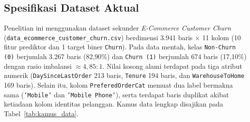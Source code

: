 \documentclass[11pt,a4paper]{article}
\DeclareRobustCommand{\code}[1]{\texttt{\textcolor{CodeColor}{#1}}}
\begin{document}
\subsection{Spesifikasi Dataset Aktual}

Penelitian ini menggunakan dataset sekunder \textit{E-Commerce Customer Churn} (\code{data\_\allowbreak ecommerce\_\allowbreak customer\_\allowbreak churn.csv}) berdimensi 3.941 baris $\times$ 11 kolom (10 fitur prediktor dan 1 target biner \code{Churn}). Pada data mentah, kelas \code{Non-Churn (0)} berjumlah 3.267 baris (82,90\%) dan \code{Churn (1)} berjumlah 674 baris (17,10\%) dengan rasio imbalansi $\approx 4{,}85 : 1$. Nilai kosong alami terdapat pada tiga atribut numerik (\code{DaySinceLastOrder} 213 baris, \code{Tenure} 194 baris, dan \code{WarehouseToHome} 169 baris). Selain itu, kolom \code{PreferedOrderCat} memuat dua label bermakna sama (\code{'Mobile'} dan \code{'Mobile Phone'}), serta terdapat baris duplikat akibat ketiadaan kolom identitas pelanggan. Kamus data lengkap disajikan pada Tabel~\ref{tab:kamus_data}.
\end{document}
